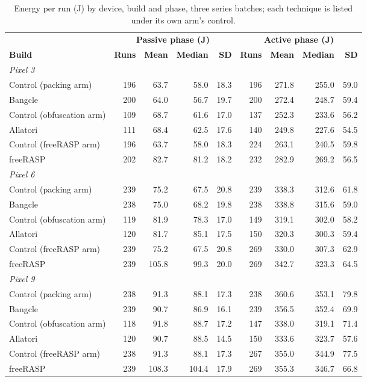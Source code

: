 \begin{table}[t]
\centering
\small
\caption{Energy per run (J) by device, build and phase, three series batches; each technique is listed under its own arm's control.}
\label{tab:descriptives-device}
\begin{tabular}{lrrrrrrrr}
\toprule
 & \multicolumn{4}{c}{\textbf{Passive phase (J)}} & \multicolumn{4}{c}{\textbf{Active phase (J)}} \\
\cmidrule(lr){2-5} \cmidrule(lr){6-9}
\textbf{Build} & \textbf{Runs} & \textbf{Mean} & \textbf{Median} & \textbf{SD} & \textbf{Runs} & \textbf{Mean} & \textbf{Median} & \textbf{SD} \\
\midrule
\multicolumn{9}{l}{\textit{Pixel 3}} \\
Control (packing arm) & 196 & 63.7 & 58.0 & 18.3 & 196 & 271.8 & 255.0 & 59.0 \\
Bangcle & 200 & 64.0 & 56.7 & 19.7 & 200 & 272.4 & 248.7 & 59.4 \\
Control (obfuscation arm) & 109 & 68.7 & 61.6 & 17.0 & 137 & 252.3 & 233.6 & 56.2 \\
Allatori & 111 & 68.4 & 62.5 & 17.6 & 140 & 249.8 & 227.6 & 54.5 \\
Control (freeRASP arm) & 196 & 63.7 & 58.0 & 18.3 & 224 & 263.1 & 240.5 & 59.8 \\
freeRASP & 202 & 82.7 & 81.2 & 18.2 & 232 & 282.9 & 269.2 & 56.5 \\
\midrule
\multicolumn{9}{l}{\textit{Pixel 6}} \\
Control (packing arm) & 239 & 75.2 & 67.5 & 20.8 & 239 & 338.3 & 312.6 & 61.8 \\
Bangcle & 238 & 75.0 & 68.2 & 19.8 & 238 & 338.8 & 315.6 & 59.0 \\
Control (obfuscation arm) & 119 & 81.9 & 78.3 & 17.0 & 149 & 319.1 & 302.0 & 58.2 \\
Allatori & 120 & 81.7 & 85.1 & 17.5 & 150 & 320.3 & 300.3 & 59.4 \\
Control (freeRASP arm) & 239 & 75.2 & 67.5 & 20.8 & 269 & 330.0 & 307.3 & 62.9 \\
freeRASP & 239 & 105.8 & 99.3 & 20.0 & 269 & 342.7 & 323.3 & 64.5 \\
\midrule
\multicolumn{9}{l}{\textit{Pixel 9}} \\
Control (packing arm) & 238 & 91.3 & 88.1 & 17.3 & 238 & 360.6 & 353.1 & 79.8 \\
Bangcle & 239 & 90.7 & 86.9 & 16.1 & 239 & 356.5 & 352.4 & 69.9 \\
Control (obfuscation arm) & 118 & 91.8 & 88.7 & 17.2 & 147 & 338.0 & 319.1 & 71.4 \\
Allatori & 120 & 90.7 & 88.5 & 14.5 & 150 & 333.6 & 323.7 & 57.6 \\
Control (freeRASP arm) & 238 & 91.3 & 88.1 & 17.3 & 267 & 355.0 & 344.9 & 77.5 \\
freeRASP & 239 & 108.3 & 104.4 & 17.9 & 269 & 355.3 & 346.7 & 66.8 \\
\bottomrule
\end{tabular}
\end{table}
